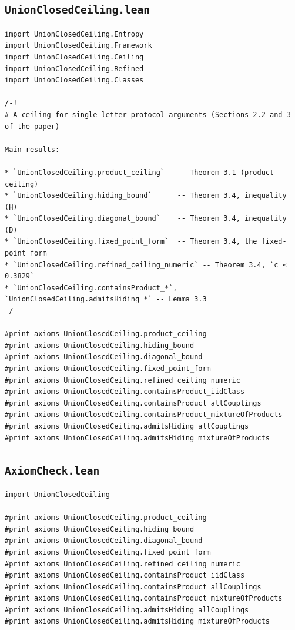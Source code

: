 \documentclass[11pt,a4paper]{article}
\theoremstyle{definition}
\theoremstyle{remark}
\begin{document}
\subsection{\texttt{UnionClosedCeiling.lean}}
\begin{Verbatim}[fontsize=\scriptsize,formatcom=\leanmono,samepage=false]
import UnionClosedCeiling.Entropy
import UnionClosedCeiling.Framework
import UnionClosedCeiling.Ceiling
import UnionClosedCeiling.Refined
import UnionClosedCeiling.Classes

/-!
# A ceiling for single-letter protocol arguments (Sections 2.2 and 3 of the paper)

Main results:

* `UnionClosedCeiling.product_ceiling`   -- Theorem 3.1 (product ceiling)
* `UnionClosedCeiling.hiding_bound`      -- Theorem 3.4, inequality (H)
* `UnionClosedCeiling.diagonal_bound`    -- Theorem 3.4, inequality (D)
* `UnionClosedCeiling.fixed_point_form`  -- Theorem 3.4, the fixed-point form
* `UnionClosedCeiling.refined_ceiling_numeric` -- Theorem 3.4, `c ≤ 0.3829`
* `UnionClosedCeiling.containsProduct_*`, `UnionClosedCeiling.admitsHiding_*` -- Lemma 3.3
-/

#print axioms UnionClosedCeiling.product_ceiling
#print axioms UnionClosedCeiling.hiding_bound
#print axioms UnionClosedCeiling.diagonal_bound
#print axioms UnionClosedCeiling.fixed_point_form
#print axioms UnionClosedCeiling.refined_ceiling_numeric
#print axioms UnionClosedCeiling.containsProduct_iidClass
#print axioms UnionClosedCeiling.containsProduct_allCouplings
#print axioms UnionClosedCeiling.containsProduct_mixtureOfProducts
#print axioms UnionClosedCeiling.admitsHiding_allCouplings
#print axioms UnionClosedCeiling.admitsHiding_mixtureOfProducts
\end{Verbatim}

\subsection{\texttt{AxiomCheck.lean}}
\begin{Verbatim}[fontsize=\scriptsize,formatcom=\leanmono,samepage=false]
import UnionClosedCeiling

#print axioms UnionClosedCeiling.product_ceiling
#print axioms UnionClosedCeiling.hiding_bound
#print axioms UnionClosedCeiling.diagonal_bound
#print axioms UnionClosedCeiling.fixed_point_form
#print axioms UnionClosedCeiling.refined_ceiling_numeric
#print axioms UnionClosedCeiling.containsProduct_iidClass
#print axioms UnionClosedCeiling.containsProduct_allCouplings
#print axioms UnionClosedCeiling.containsProduct_mixtureOfProducts
#print axioms UnionClosedCeiling.admitsHiding_allCouplings
#print axioms UnionClosedCeiling.admitsHiding_mixtureOfProducts
\end{Verbatim}
\end{document}
